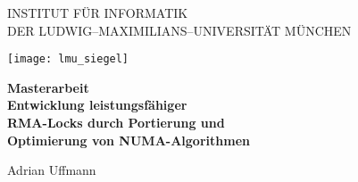 
\thispagestyle{empty}

\begin{center}

    \vspace*{-2cm}

    {\Huge INSTITUT FÜR INFORMATIK\\[1mm]}
    DER LUDWIG--MAXIMILIANS--UNIVERSITÄT MÜNCHEN\\

    \vspace*{1cm}

    \texttt{[image: lmu\_siegel]}

    \vspace*{2cm}

    {\Large \textbf{Masterarbeit}}\\

    \vspace{2.0cm}
    {\huge \textbf{Entwicklung leistungsfähiger}}\\
    \vspace*{3mm}
    {\huge \textbf{RMA-Locks durch Portierung und}}\\
    \vspace*{3mm}
    {\huge \textbf{Optimierung von NUMA-Algorithmen}}\\
    \vspace{1.5cm}

    {\LARGE Adrian Uffmann} %

\end{center}

\newpage


\thispagestyle{empty}
\cleardoublepage


\thispagestyle{empty}

